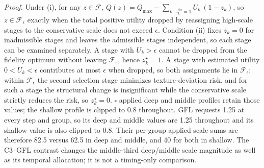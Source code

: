 \documentclass[times,twocolumn,final]{elsarticle}
\providecommand{\DIFadd}[1]{{\protect\color{blue} \sf #1}} %
\providecommand{\DIFdel}[1]{{\protect\color{red} \scriptsize #1}} %
\providecommand{\DIFaddbegin}{} %
\providecommand{\DIFaddend}{} %
\providecommand{\DIFdelend}{} %
\begin{document}
\DIFdel{\textit{Proof.} Under (i), for any $z\in\mathcal{F}$, $Q(z)=Q_{\max}-\sum_{k:\,z_k^{\mathrm{fid}}=1}U_k\,(1-z_k)$, so $z\in\mathcal{F}_\epsilon$ exactly when the total positive utility dropped by reassigning high-scale stages to the conservative scale does not exceed $\epsilon$. Condition (ii) fixes $z_k=0$ for inadmissible stages and leaves the admissible stages independent, so each stage can be examined separately. A stage with $U_k>\epsilon$ cannot be dropped from the fidelity optimum without leaving $\mathcal{F}_\epsilon$, hence $z_k^{\star}=1$. A stage with estimated utility $0<U_k<\epsilon$ contributes at most $\epsilon$ when dropped, so both assignments lie in $\mathcal{F}_\epsilon$; within $\mathcal{F}_\epsilon$ the second selection stage minimizes texture-deviation risk, and for such a stage the structural change is insignificant while the conservative scale strictly reduces the risk, so $z_k^{\star}=0$.
}%
\DIFdel{$\square$
}%
\DIFdelend \DIFaddbegin \DIFadd{applied deep and middle profiles retain those values; the shallow profile is clipped to 0.8 throughout. GFL requests 1.25 at every step and group, so its deep and middle values are 1.25 throughout and its shallow value is also clipped to 0.8. Their per-group applied-scale sums are therefore 82.5 versus 62.5 in deep and middle, and 40 for both in shallow. The C3--GFL contrast changes the middle-third deep/middle scale magnitude as well as its temporal allocation; it is not a timing-only comparison.
}\DIFaddend 
\end{document}
